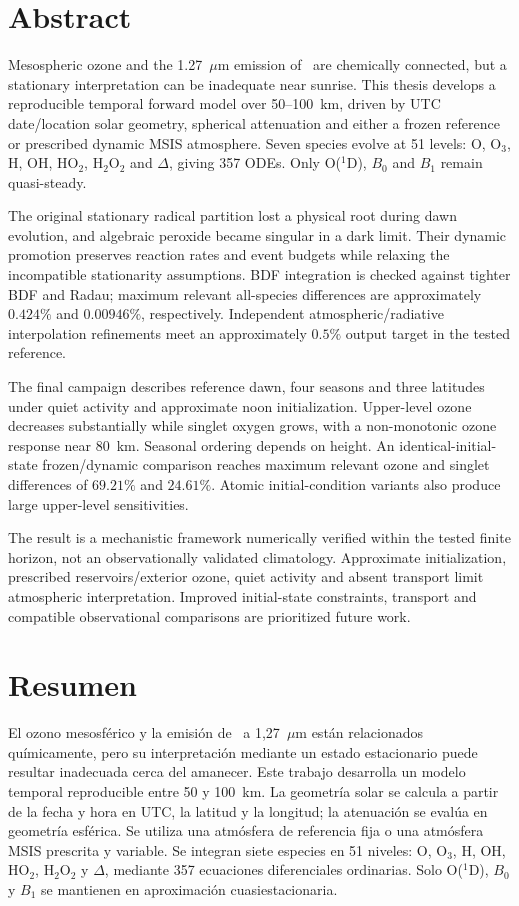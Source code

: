 \chapter*{Abstract}
Mesospheric ozone and the 1.27~$\mu$m emission of \singlet\ are chemically connected, but a stationary interpretation can be inadequate near sunrise. This thesis develops a reproducible temporal forward model over 50--100~km, driven by UTC date/location solar geometry, spherical attenuation and either a frozen reference or prescribed dynamic MSIS atmosphere. Seven species evolve at 51 levels: O, O$_3$, H, OH, HO$_2$, H$_2$O$_2$ and $\Delta$, giving 357 ODEs. Only O($^1$D), $B_0$ and $B_1$ remain quasi-steady.

The original stationary radical partition lost a physical root during dawn evolution, and algebraic peroxide became singular in a dark limit. Their dynamic promotion preserves reaction rates and event budgets while relaxing the incompatible stationarity assumptions. BDF integration is checked against tighter BDF and Radau; maximum relevant all-species differences are approximately $0.424\%$ and $0.00946\%$, respectively. Independent atmospheric/radiative interpolation refinements meet an approximately $0.5\%$ output target in the tested reference.

The final campaign describes reference dawn, four seasons and three latitudes under quiet activity and approximate noon initialization. Upper-level ozone decreases substantially while singlet oxygen grows, with a non-monotonic ozone response near 80~km. Seasonal ordering depends on height. An identical-initial-state frozen/dynamic comparison reaches maximum relevant ozone and singlet differences of $69.21\%$ and $24.61\%$. Atomic initial-condition variants also produce large upper-level sensitivities.

The result is a mechanistic framework numerically verified within the tested finite horizon, not an observationally validated climatology. Approximate initialization, prescribed reservoirs/exterior ozone, quiet activity and absent transport limit atmospheric interpretation. Improved initial-state constraints, transport and compatible observational comparisons are prioritized future work.

\chapter*{Resumen}
El ozono mesosf\'erico y la emisi\'on de \singlet\ a 1,27~$\mu$m est\'an relacionados qu\'imicamente, pero su interpretaci\'on mediante un estado estacionario puede resultar inadecuada cerca del amanecer. Este trabajo desarrolla un modelo temporal reproducible entre 50 y 100~km. La geometr\'ia solar se calcula a partir de la fecha y hora en UTC, la latitud y la longitud; la atenuaci\'on se eval\'ua en geometr\'ia esf\'erica. Se utiliza una atm\'osfera de referencia fija o una atm\'osfera MSIS prescrita y variable. Se integran siete especies en 51 niveles: O, O$_3$, H, OH, HO$_2$, H$_2$O$_2$ y $\Delta$, mediante 357 ecuaciones diferenciales ordinarias. Solo O($^1$D), $B_0$ y $B_1$ se mantienen en aproximaci\'on cuasiestacionaria.

